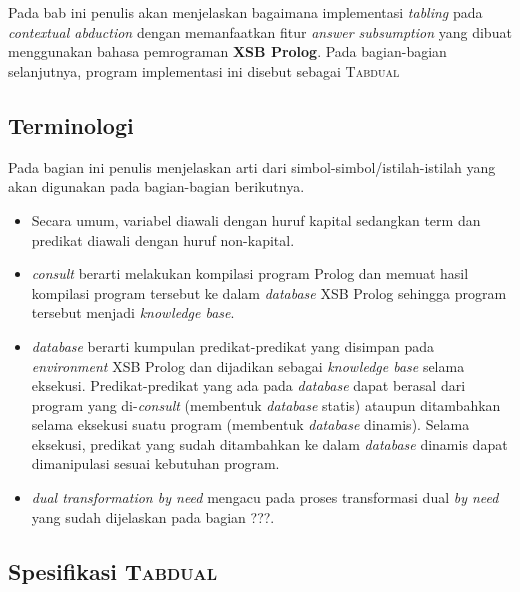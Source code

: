 \chapter{\babTiga}
Pada bab ini penulis akan menjelaskan bagaimana implementasi \textit{tabling} pada \textit{contextual abduction} dengan memanfaatkan fitur \textit{answer subsumption} yang dibuat menggunakan bahasa pemrograman \textbf{XSB Prolog}. Pada bagian-bagian selanjutnya, program implementasi ini disebut sebagai \textsc{Tabdual}

\section{Terminologi}

Pada bagian ini penulis menjelaskan arti dari simbol-simbol/istilah-istilah yang akan digunakan pada bagian-bagian berikutnya. 

\begin{itemize}
	\item Secara umum, variabel diawali dengan huruf kapital sedangkan term dan predikat diawali dengan huruf non-kapital.
	\item \textit{consult} berarti melakukan kompilasi program Prolog dan memuat hasil kompilasi program tersebut ke dalam \textit{database} XSB Prolog sehingga program tersebut menjadi \textit{knowledge base}.
	\item \textit{database} berarti kumpulan predikat-predikat yang disimpan pada \textit{environment} XSB Prolog dan dijadikan sebagai \textit{knowledge base} selama eksekusi. Predikat-predikat yang ada pada \textit{database} dapat berasal dari program yang di-\textit{consult} (membentuk \textit{database} statis) ataupun ditambahkan selama eksekusi suatu program (membentuk \textit{database} dinamis). Selama eksekusi, predikat yang sudah ditambahkan ke dalam \textit{database} dinamis dapat dimanipulasi sesuai kebutuhan program.
	\item \textit{dual transformation by need} mengacu pada proses transformasi dual \textit{by need} yang sudah dijelaskan pada bagian ???.
\end{itemize}

\section{Spesifikasi \textsc{Tabdual}}


